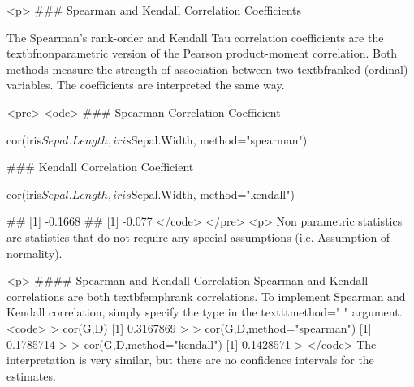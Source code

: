 <p>
### Spearman and Kendall Correlation Coefficients

The Spearman's rank-order and Kendall Tau correlation coefficients are the textbf{nonparametric} version of the Pearson product-moment correlation. 
Both methods measure the strength of association between two textbf{ranked} (ordinal) variables. 
The coefficients are interpreted the same way.

<pre>
<ode>
### Spearman Correlation Coefficient

cor(iris$Sepal.Length,iris$Sepal.Width, 
   method="spearman")
   
### Kendall Correlation Coefficient

cor(iris$Sepal.Length,iris$Sepal.Width, 
   method="kendall")

## [1] -0.1668
## [1] -0.077
</code>
</pre>
<p>
Non parametric statistics are statistics that do not require any special assumptions (i.e. Assumption of normality).

<p>
#### {Spearman and Kendall Correlation}
Spearman and Kendall correlations are both textbf{emph{rank correlations}}. 
To implement Spearman and Kendall correlation, simply specify the type in the texttt{method=" "} argument.
<code>
> cor(G,D)
[1] 0.3167869
>
> cor(G,D,method="spearman")
[1] 0.1785714
>
> cor(G,D,method="kendall")
[1] 0.1428571
> 
</code>
The interpretation is very similar, but there are no confidence intervals for the estimates.
